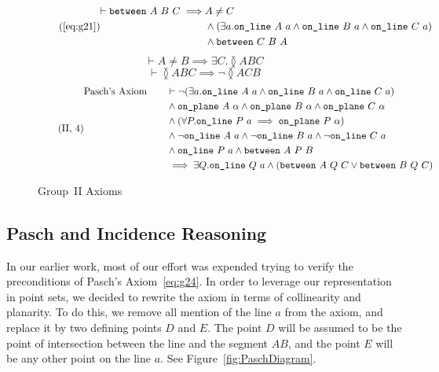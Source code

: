 \begin{figure}
\begin{equation}
 \tag{\ref{eq:g21}}
  \begin{split}
    \vdash\between{A}{B}{C} \implies & A \neq C\\
                               & \wedge (\exists a. \code{on\_line}\ A\ a \wedge \code{on\_line}\ B\ a \wedge \code{on\_line}\ C\ a)\\
                               & \wedge \between{C}{B}{A}
  \end{split}
\end{equation}
\begin{equation}\label{eq:g22}
  \tag{II,~2}
  \vdash A \neq B \implies \exists C. \between{A}{B}{C}
\end{equation}
\begin{equation}\label{eq:g23}
  \tag{II,~3}
  \vdash\between{A}{B}{C} \implies \neg\between{A}{C}{B}
\end{equation}
\begin{equation}\label{eq:g24}
  \tag{II,~4}
  \begin{split}
    \text{Pasch's Axiom}\qquad & \vdash\neg(\exists a.\texttt{on\_line}\ A\ a\wedge \texttt{on\_line}\ B\ a\wedge \texttt{on\_line}\ C\ a)\\
    & \wedge \texttt{on\_plane}\ A\ \alpha \wedge \texttt{on\_plane}\ B\ \alpha \wedge \texttt{on\_plane}\ C\ \alpha \\
    & \wedge (\forall P. \texttt{on\_line}\ P\ a \implies \texttt{on\_plane}\ P\ \alpha)\\
    & \wedge \neg\texttt{on\_line}\ A\ a \wedge \neg\texttt{on\_line}\ B\ a \wedge \neg\texttt{on\_line}\ C\ a\\
    & \wedge \texttt{on\_line}\ P\ a \wedge \texttt{between}\ A\ P\ B\\
    & \implies \exists Q. \texttt{on\_line}\ Q\ a \wedge (\texttt{between}\ A\ Q\ C \vee \texttt{between}\ B\ Q\ C)
  \end{split}
\end{equation}
\caption{Group~II Axioms}
\label{fig:Group2Axioms}
\end{figure}

\subsection{Pasch and Incidence Reasoning}
In our earlier work, most of our effort was expended trying to verify the preconditions of Pasch's Axiom~\eqref{eq:g24}. In order to leverage our representation in point sets, we decided to rewrite the axiom in terms of collinearity and planarity. To do this, we remove all mention of the line $a$ from the axiom, and replace it by two defining points $D$ and $E$. The point $D$ will be assumed to be the point of intersection between the line and the segment $AB$, and the point $E$ will be any other point on the line $a$. See Figure~\ref{fig:PaschDiagram}.

